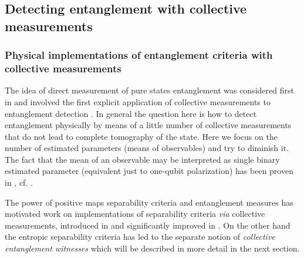 \documentclass[twocolumn,aps,rmp]{revtex4}
\begin{document}
\subsection{Detecting entanglement with collective measurements}
\label{subsec:det_ent_col}

\subsubsection{Physical implementations of entanglement criteria with
collective measurements \label{subsubsec:MapsDetected}}

The idea of direct measurement of pure states entanglement was
considered first in \cite{SH00} and involved the first
explicit application of collective measurements to entanglement
detection \cite{Acin}. In general the question here is how
to detect entanglement physically by means of a little number of
collective measurements that do not lead to complete tomography of the
state. Here we focus on the number of estimated parameters (means of
observables) and try to diminish it. The fact that the mean of an
observable may be interpreted as single binary estimated parameter
(equivalent just to one-qubit polarization) has been proven in
\cite{binpovm,PazRoncaglia}, cf. \cite{Brun}.

The power of positive maps separability criteria and entanglement
measures has motivated work on implementations of separability
criteria {\it via} collective measurements, introduced in
\cite{PHAE,PHPRL} and significantly improved in
\cite{Carteret,Noiseless}. On the other hand the entropic separability
criteria has led to the separate notion of {\it collective
  entanglement witnesses} \cite{Witnesses} which will be described in
more detail in the next section.
\end{document}
